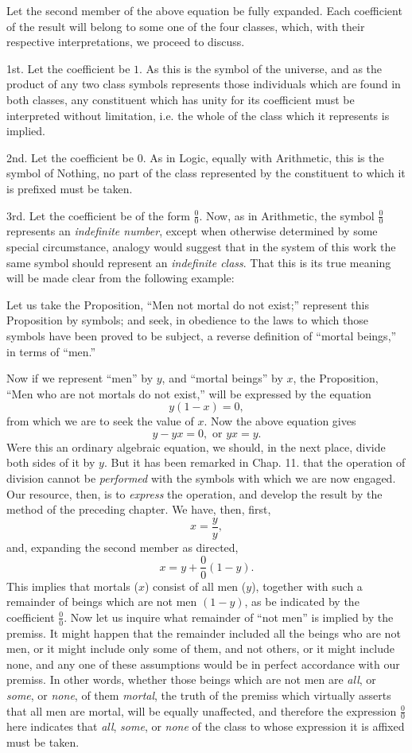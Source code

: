\documentclass[oneside]{book}
\begin{document}
Let the second member of the above equation be fully expanded.
Each coefficient of the result will belong to some one
of the four classes, which, with their respective interpretations,
we proceed to discuss.

1st. Let the coefficient be $1$. As this is the symbol of the
universe, and as the product of any two class symbols represents
those individuals which are found in both classes, any constituent
which has unity for its coefficient must be interpreted without
limitation, i.e. the whole of the class which it represents is
implied.

2nd. Let the coefficient be $0$. As in Logic, equally with
Arithmetic, this is the symbol of Nothing, no part of the class
represented by the constituent to which it is prefixed must be
taken.

3rd. Let the coefficient be of the form $\frac{0}{0}$. Now, as in Arithmetic,
the symbol $\frac{0}{0}$ represents an \textit{indefinite number}, except when
otherwise determined by some special circumstance, analogy
would suggest that in the system of this work the same symbol
should represent an \textit{indefinite class}. That this is its true
meaning will be made clear from the following example:

Let us take the Proposition, ``Men not mortal do not exist;''
represent this Proposition by symbols; and seek, in obedience to
the laws to which those symbols have been proved to be subject,
a reverse definition of ``mortal beings,'' in terms of ``men.''

Now if we represent ``men'' by $y$, and ``mortal beings'' by $x$,
the Proposition, ``Men who are not mortals do not exist,'' will
be expressed by the equation
\[
y \left(1 - x\right) = 0,
\]
from which we are to seek the value of $x$. Now the above
equation gives
\[
y - yx = 0,\textrm{ or }yx = y.
\]
Were this an ordinary algebraic equation, we should, in the next
place, divide both sides of it by $y$. But it has been remarked in
Chap. 11. that the operation of division cannot be \textit{performed} with
the symbols with which we are now engaged. Our resource, then,
is to \textit{express} the operation, and develop the result by the method
of the preceding chapter. We have, then, first,
\[
x = \frac{y}{y},
\]
and, expanding the second member as directed,
\[
x = y + \frac{0}{0}\left(1 - y\right).
\]
This implies that mortals ($x$) consist of all men ($y$), together
with such a remainder of beings which are not men $\left(1 - y\right)$, as
be indicated by the coefficient $\frac{0}{0}$. Now let us inquire what
remainder of ``not men'' is implied by the premiss. It might
happen that the remainder included all the beings who are not
men, or it might include only some of them, and not others, or it
might include none, and any one of these assumptions would be
in perfect accordance with our premiss. In other words, whether
those beings which are not men are \textit{all}, or \textit{some}, or \textit{none}, of them
\textit{mortal}, the truth of the premiss which virtually asserts that all
men are mortal, will be equally unaffected, and therefore the
expression $\frac{0}{0}$ here indicates that \textit{all}, \textit{some}, or \textit{none} of the class to
whose expression it is affixed must be taken.
\end{document}
